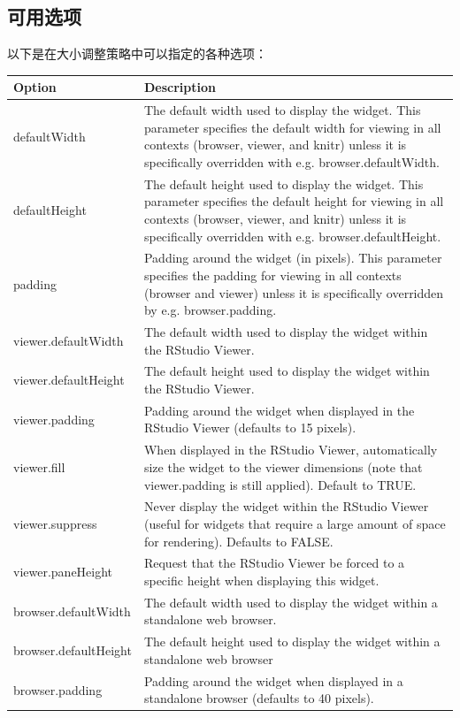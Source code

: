 \documentclass[]{book}
\theoremstyle{definition}
\theoremstyle{definition}
\theoremstyle{definition}
\theoremstyle{remark}
\begin{document}
\subsection{可用选项}

以下是在大小调整策略中可以指定的各种选项：

\begin{tabular}{ll}
\toprule
Option & Description\\
\midrule
defaultWidth & The default width used to display the widget. This parameter specifies the default width for viewing in all contexts (browser, viewer, and knitr) unless it is specifically overridden with e.g. browser.defaultWidth.\\
defaultHeight & The default height used to display the widget. This parameter specifies the default height for viewing in all contexts (browser, viewer, and knitr) unless it is specifically overridden with e.g. browser.defaultHeight.\\
padding & Padding around the widget (in pixels). This parameter specifies the padding for viewing in all contexts (browser and viewer) unless it is specifically overridden by e.g. browser.padding.\\
viewer.defaultWidth & The default width used to display the widget within the RStudio Viewer.\\
viewer.defaultHeight & The default height used to display the widget within the RStudio Viewer.\\
\addlinespace
viewer.padding & Padding around the widget when displayed in the RStudio Viewer (defaults to 15 pixels).\\
viewer.fill & When displayed in the RStudio Viewer, automatically size the widget to the viewer dimensions (note that viewer.padding is still applied). Default to TRUE.\\
viewer.suppress & Never display the widget within the RStudio Viewer (useful for widgets that require a large amount of space for rendering). Defaults to FALSE.\\
viewer.paneHeight & Request that the RStudio Viewer be forced to a specific height when displaying this widget.\\
browser.defaultWidth & The default width used to display the widget within a standalone web browser.\\
\addlinespace
browser.defaultHeight & The default height used to display the widget within a standalone web browser\\
browser.padding & Padding around the widget when displayed in a standalone browser (defaults to 40 pixels).\\

\end{tabular}
\end{document}
